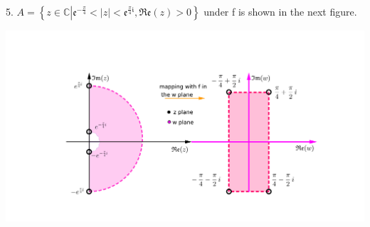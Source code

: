 \documentclass[10.5pt]{amsart}
\newcommand{\dsp}{\displaystyle}
\newcommand{\BBC}{\mathbb{C}}\newcommand{\mi}{\mathfrak{i}}
\begin{document}
5. $\dsp A=\left\{z\in\BBC\left|\mathfrak{e}^{-\frac{\pi}{4}}<|z|<\mathfrak{e}^{\frac{\pi}{4}\mi},\mathfrak{Re}(z)>0\right.\right\}$ 
under f is shown in the next figure.
\begin{center}\includegraphics{2e.png}\end{center}
\end{document}
